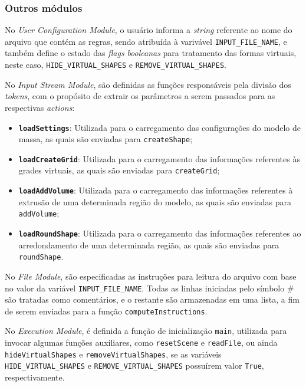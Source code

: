 \clearpage

\subsubsection{Outros módulos}
\label{sec:outros_modulos}

No \textit{User Configuration Module}, o usuário informa a \textit{string} referente ao nome do arquivo que contém as regras, sendo atribuída à varivável \texttt{INPUT\_FILE\_NAME}, e também define o estado das \textit{flags} \textit{booleanas} para tratamento das formas virtuais, neste caso, \texttt{HIDE\_VIRTUAL\_SHAPES} e \texttt{REMOVE\_VIRTUAL\_SHAPES}.

No \textit{Input Stream Module}, são definidas as funções responsáveis pela divisão dos \textit{tokens}, com o propósito de extrair os parâmetros a serem passados para as respectivas \textit{actions}:

\vspace{0.3cm}

\begin{itemize}
    \item \textbf{\texttt{loadSettings}}: Utilizada para o carregamento das configurações do modelo de massa, as quais são enviadas para \texttt{createShape};
    
    \item \textbf{\texttt{loadCreateGrid}}: Utilizada para o carregamento das informações referentes às grades virtuais, as quais são enviadas para \texttt{createGrid};
    
    \item \textbf{\texttt{loadAddVolume}}: Utilizada para o carregamento das informações referentes à extrusão de uma determinada região do modelo, as quais são enviadas para \texttt{addVolume};
    
    \item \textbf{\texttt{loadRoundShape}}: Utilizada para o carregamento das informações referentes ao arredondamento de uma determinada região, as quais são enviadas para \texttt{roundShape}.
\end{itemize}

No \textit{File Module}, são especificadas as instruções para leitura do arquivo com base no valor da variável \texttt{INPUT\_FILE\_NAME}. Todas as linhas iniciadas pelo símbolo $\#$ são tratadas como comentários, e o restante são armazenadas em uma lista, a fim de serem enviadas para a função \texttt{computeInstructions}.

No \textit{Execution Module},  é definida a função de inicialização \texttt{main}, utilizada para invocar algumas funções auxiliares, como \texttt{resetScene} e \texttt{readFile}, ou ainda \texttt{hideVirtualShapes} e \texttt{removeVirtualShapes}, se as variáveis \texttt{HIDE\_VIRTUAL\_SHAPES} e \texttt{REMOVE\_VIRTUAL\_SHAPES} possuírem valor \texttt{True}, respectivamente.

